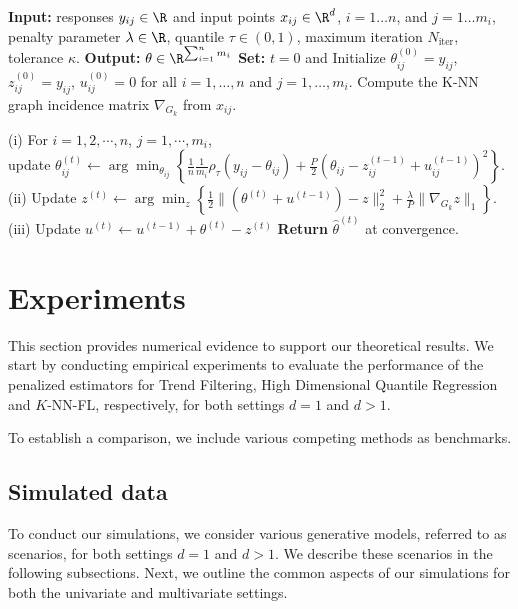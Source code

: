 \documentclass[twoside,11pt]{article}
\begin{document}
\begin{algorithm}[!htbp]
   \caption{Alternating Directions Method of Multipliers for quantile spatial temporal trend filtering in \eqref{70}}
\label{alg_knn_admm}
\begin{algorithmic}[1]
    \STATE {\bfseries } \textbf{Input:} responses \(y_{ij} \in \R\) and input points \(x_{ij} \in \R^d\), \(i = 1 \dots n\), and \(j = 1 \dots m_i\), penalty parameter \(\lambda \in \R\), quantile \( \tau \in (0, 1)\), maximum iteration \( N_{\text{iter}} \), tolerance \( \kappa \).
   \STATE \textbf{Output:} \( \theta \in \R^{\sum_{i=1}^n m_i} \)
   \STATE \textbf{Set:} \(t = 0\) and Initialize \( \theta_{ij}^{(0)} = y_{ij} \), \( z_{ij}^{(0)} = y_{ij} \), \( u_{ij}^{(0)} = 0 \) for all \(i = 1, \ldots, n\) and \(j = 1, \ldots, m_i\).
   \STATE Compute the K-NN graph incidence matrix $\nabla_{G_k}$ from $x_{ij}$. 

 \STATE (i) For $i=1,2,\cdots,n $, $j = 1, \cdots, m_i$, \\ \quad update
 \( \theta_{ij}^{(t)} \leftarrow \arg\min_{\theta_{ij}} \left\{ \frac{1}{n} \frac{1}{m_i}\rho_{\tau} (y_{ij} - \theta_{ij}) + \frac{P}{2} \left( \theta_{ij} - z_{ij}^{(t-1)} + u_{ij}^{(t-1)} \right)^2 \right\}. \)
 \STATE (ii) Update
 \( z^{(t)} \leftarrow \arg\min_{z} \left\{ \frac{1}{2} \|(\theta^{(t)} + u^{(t-1)}) - z\|_2^2 + \frac{\lambda}{P} \|\nabla_{G_k} z\|_1 \right\} \).
 \STATE (iii) Update
\( u^{(t)} \leftarrow u^{(t-1)} + \theta^{(t)} - z^{(t)} \)
\ENDFOR
\STATE \textbf{Return} $\hat \theta^{(t)}$ at convergence. 
\end{algorithmic}
\end{algorithm}


\section{Experiments}

This section provides numerical evidence to support our theoretical results. We start by conducting empirical experiments to evaluate the performance of the penalized estimators for Trend Filtering, High Dimensional Quantile Regression and \( K \)-NN-FL, respectively, for both settings \( d = 1 \) and \( d > 1 \). 

To establish a comparison, we include various competing methods as benchmarks. 

\subsection{Simulated data}
\label{subsec:simulated_data}
To conduct our simulations, we consider various generative models, referred to as scenarios, for both settings \( d = 1 \) and \( d > 1 \). We describe these scenarios in the following subsections. Next, we outline the common aspects of our simulations for both the univariate and multivariate settings.
\end{document}
